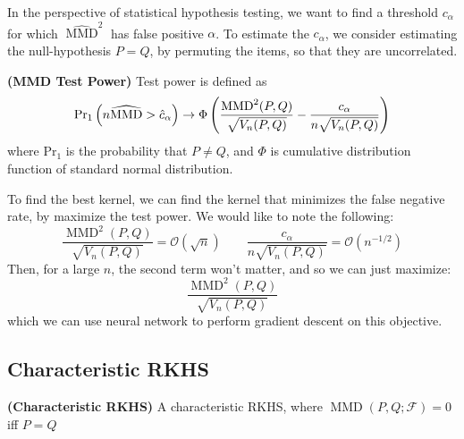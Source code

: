 \begin{remark}
    In the perspective of statistical hypothesis testing, we want to find a threshold $c_\alpha$ for which $\widehat{\operatorname{MMD}}^2$ has false positive $\alpha$. To estimate the $c_\alpha$, we consider estimating the null-hypothesis $P=Q$, by permuting the items, so that they are uncorrelated. 
\end{remark}

\begin{definition}{\textbf{(MMD Test Power)}}
    Test power is defined as 
    \begin{equation*}
       \text{Pr}_1\left( n\widehat{\operatorname{MMD}} > \hat{c}_\alpha  \right) \rightarrow  \Phi\left( \frac{\operatorname{MMD}^2(P, Q)}{\sqrt{V_n(P, Q)}} - \frac{c_\alpha}{n\sqrt{V_n(P, Q)}}  \right)
    \end{equation*}
    where $\text{Pr}_1$ is the probability that $P\ne Q$, and $\Phi$ is cumulative distribution function of standard normal distribution.
\end{definition}

\begin{remark}
    To find the best kernel, we can find the kernel that minimizes the false negative rate, by maximize the test power. We would like to note the following:
    \begin{equation*}
        \frac{\operatorname{MMD}^2(P, Q)}{\sqrt{V_n(P, Q)}} = \mathcal{O}(\sqrt{n}) \qquad \frac{c_\alpha}{n\sqrt{V_n(P, Q)}} =\mathcal{O}(n^{-1/2})
    \end{equation*}
    Then, for a large $n$, the second term won't matter, and so we can just maximize:
    \begin{equation*}
        \frac{\operatorname{MMD}^2(P, Q)}{\sqrt{V_n(P, Q)}}
    \end{equation*}
    which we can use neural network to perform gradient descent on this objective.
\end{remark}

\subsection{Characteristic RKHS}

\begin{definition}{\textbf{(Characteristic RKHS)}}
    A characteristic RKHS, where $\operatorname{MMD}(P, Q; \mathcal{F}) = 0$ iff $P = Q$
\end{definition}

